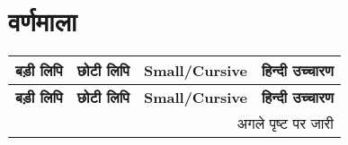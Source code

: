 \section{वर्णमाला} \label{sec:alpha-list}
  \begin{tabularx}{\linewidth}{| c | c | c | X |}
    \caption{वर्णमाला}\label{tab:alphabet}
    \toprule

    \hline \textbf{बड़ी लिपि} & \textbf{छोटी लिपि} & \textbf{Small/Cursive}  & \textbf{हिन्दी उच्चारण}                                                                                 \\ \hline
    \endfirsthead

    \hline \textbf{बड़ी लिपि} & \textbf{छोटी लिपि} & \textbf{Small/Cursive}  & \textbf{हिन्दी उच्चारण}                                                                                 \\ \hline
    \endhead

    \multicolumn{4}{r}{\footnotesize{अगले पृष्ट पर जारी}}
    \endfoot

    \bottomrule
    \endlastfoot


\end{tabularx}
